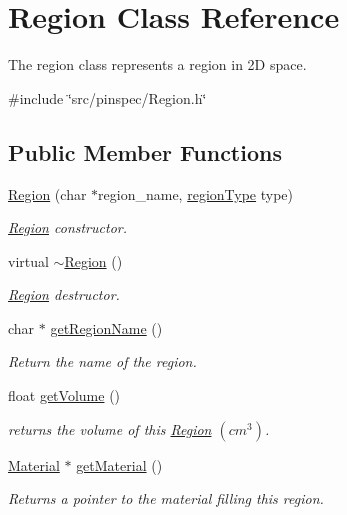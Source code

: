 \hypertarget{classRegion}{\section{Region Class Reference}
\label{classRegion}
}


The region class represents a region in 2\-D space.  




{\ttfamily \#include \char`\"{}src/pinspec/\-Region.\-h\char`\"{}}

\subsection*{Public Member Functions}
\begin{DoxyCompactItemize}
\item 
\hyperlink{classRegion_ab0d1873c68539b5339811f413ecb4dbb}{Region} (char $\ast$region\-\_\-name, \hyperlink{Region_8h_a2c25b4a3d851e2d45d7a435a73598323}{region\-Type} type)
\begin{DoxyCompactList}\small\item\em \hyperlink{classRegion}{Region} constructor. \end{DoxyCompactList}\item 
virtual \hyperlink{classRegion_a3c3670fff78f7511d156e3b2f0bc6266}{$\sim$\-Region} ()
\begin{DoxyCompactList}\small\item\em \hyperlink{classRegion}{Region} destructor. \end{DoxyCompactList}\item 
char $\ast$ \hyperlink{classRegion_abac6cb4d426f59e3b4b3f7a5ef8f4a1d}{get\-Region\-Name} ()
\begin{DoxyCompactList}\small\item\em Return the name of the region. \end{DoxyCompactList}\item 
float \hyperlink{classRegion_a2c3eca3c5373770e19d36198859f4ccb}{get\-Volume} ()
\begin{DoxyCompactList}\small\item\em returns the volume of this \hyperlink{classRegion}{Region} $ (cm^3) $. \end{DoxyCompactList}\item 
\hyperlink{classMaterial}{Material} $\ast$ \hyperlink{classRegion_ace26edc725e1f4d723964f3961e65ceb}{get\-Material} ()
\begin{DoxyCompactList}\small\item\em Returns a pointer to the material filling this region. \end{DoxyCompactList}\item 

\end{DoxyCompactItemize}
